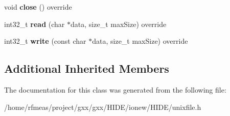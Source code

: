 \begin{DoxyCompactItemize}
\item 
void {\bfseries close} () override\hypertarget{classgxx_1_1io_1_1ufile_ae01e500b6b16373a70e8cdc6102eead4}{}\label{classgxx_1_1io_1_1ufile_ae01e500b6b16373a70e8cdc6102eead4}

\item 
int32\+\_\+t {\bfseries read} (char $\ast$data, size\+\_\+t max\+Size) override\hypertarget{classgxx_1_1io_1_1ufile_a53a4ca3f253bfba44d377b4795393662}{}\label{classgxx_1_1io_1_1ufile_a53a4ca3f253bfba44d377b4795393662}

\item 
int32\+\_\+t {\bfseries write} (const char $\ast$data, size\+\_\+t max\+Size) override\hypertarget{classgxx_1_1io_1_1ufile_a02d3f46d78315ac5ab275a97c36221af}{}\label{classgxx_1_1io_1_1ufile_a02d3f46d78315ac5ab275a97c36221af}

\end{DoxyCompactItemize}
\subsection*{Additional Inherited Members}


The documentation for this class was generated from the following file\+:\begin{DoxyCompactItemize}
\item 
/home/rfmeas/project/gxx/gxx/\+H\+I\+D\+E/ionew/\+H\+I\+D\+E/unixfile.\+h\end{DoxyCompactItemize}
